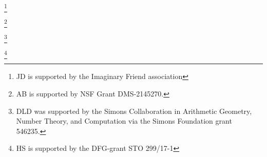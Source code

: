 \author[Doe]{Your Name Here}
\address{
  John Doe,
  Monsters University,
  Department of Mathematics,
  123 Main Street,
  Anywhere, CA
  United States of America
}
\thanks{JD is supported by the Imaginary Friend association}

\author[Bourdon]{Abbey Bourdon}
\address{
  Abbey Bourdon,
  Wake Forest University,
  Department of Mathematics, 127 Manchester Hall, PO Box 7388, Winston-Salem, NC 27109
}
\thanks{AB is supported by NSF Grant DMS-2145270.}

\author[Hashimoto]{Sachi Hashimoto}
\address{%
  Sachi Hashimoto,
  Max Planck Institut für Mathematik in den Naturwissenschaften,
  Inselstraße 22,
  04103 Leipzig
}


\author[Keller]{Timo Keller}
\address{Timo Keller, Leibniz Universität Hannover, Institut für Algebra, Zahlentheorie und Diskrete Mathematik, Welfengarten 1, 30167 Hannover, Germany}


\author[Lowry-Duda]{David Lowry-Duda}
\address{%
  David Lowry-Duda, ICERM, 121 South Main Street, Box E, 11th Floor,
  Providence, RI, 02903
}
\thanks{%
  DLD was supported by the Simons Collaboration in Arithmetic Geometry, Number
  Theory, and Computation via the Simons Foundation grant 546235.
}

\author[Shukla]{Himanshu Shukla}
\address{Himanshu Shukla, Mathematisches Institut, Uiversit\"{a}t Bayreuth, Universit\"{a}tstrasse 30, 95444 Bayreuth, Germany}
\thanks{HS is supported by the DFG-grant STO 299/17-1}
